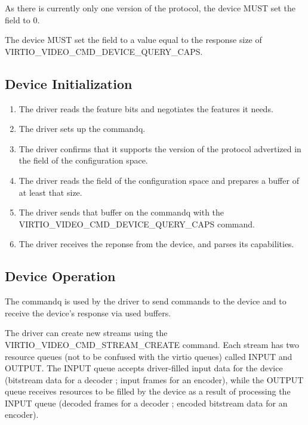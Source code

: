 As there is currently only one version of the protocol, the device MUST
set the  field to 0.

The device MUST set the  field to a value equal to
the response size of VIRTIO\_VIDEO\_CMD\_DEVICE\_QUERY\_CAPS.

\subsection{Device Initialization}\label{sec:Device Types / Video Device / Device Initialization}

\begin{enumerate}
\def\labelenumi{\arabic{enumi}.}
\item
  The driver reads the feature bits and negotiates the features it
  needs.
\item
  The driver sets up the commandq.
\item
  The driver confirms that it supports the version of the protocol
  advertized in the  field of the configuration space.
\item
  The driver reads the  field of the configuration
  space and prepares a buffer of at least that size.
\item
  The driver sends that buffer on the commandq with the
  VIRTIO\_VIDEO\_CMD\_DEVICE\_QUERY\_CAPS command.
\item
  The driver receives the reponse from the device, and parses its
  capabilities.
\end{enumerate}

\subsection{Device Operation}\label{sec:Device Types / Video Device / Device Operation}

The commandq is used by the driver to send commands to the device and to
receive the device's response via used buffers.

The driver can create new streams using the
VIRTIO\_VIDEO\_CMD\_STREAM\_CREATE command. Each stream has two resource
queues (not to be confused with the virtio queues) called INPUT and
OUTPUT. The INPUT queue accepts driver-filled input data for the device
(bitstream data for a decoder ; input frames for an encoder), while the
OUTPUT queue receives resources to be filled by the device as a result
of processing the INPUT queue (decoded frames for a decoder ; encoded
bitstream data for an encoder).

